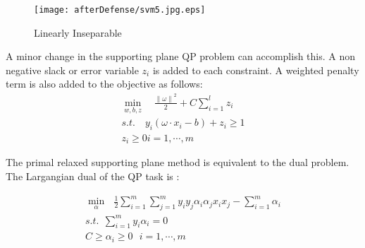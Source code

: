 \begin{figure}
	\centering
		\texttt{[image: afterDefense/svm5.jpg.eps]}
	\caption{Linearly Inseparable}
	\label{fig:svm5}
\end{figure}
A minor change in the supporting plane QP problem can accomplish this. A non negative slack or error variable $z_i$ is added to each constraint.  A weighted penalty term is also added to the objective as follows:
 \begin{equation}
 \begin{array}{c}
\min_{w,b,z}  \quad \frac{{\parallel \omega \parallel}^2}{2}+C \sum_{i=1}^{l}z_i  \\
s.t.  \quad y_i(\omega \cdot x_i -b)+z_i \geq 1  \\
    z_i \geq 0  i=1,\cdots,m
\end{array} 
\label{eq:inseperable}
\end{equation} 

The primal relaxed supporting plane method is equivalent to the dual problem. The Largangian dual of the QP task is :

\begin{equation}
\begin{array}{c}
\min_{\alpha} \ \ \   \frac{1}{2} \sum_{i=1}^{m}{\sum_{j=1}^{m}{y_iy_j\alpha_i\alpha_jx_ix_j}} - \sum_{i=1}^{m}{\alpha_i} \\
s.t. \ \ \sum_{i=1}^{m}{y_i\alpha_i}=0   \\
 C \geq \alpha_i \geq 0  \ \ \ i=1,\cdots , m 
 \end{array} 
\label{eq:dual}
\end{equation}



